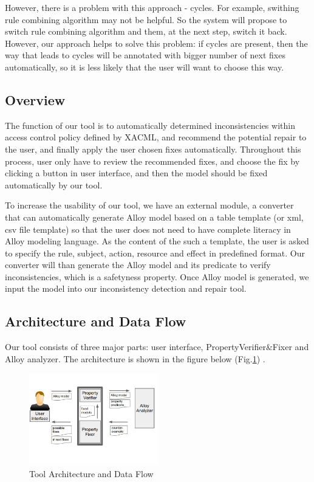 \documentclass{acm_proc_article-sp}
\begin{document}
However, there is a problem with this approach - cycles. For example, swithing rule combining algorithm may not be helpful. So the system will propose to switch rule combining algorithm and them, at the next step, switch it back. However, our approach helps to solve this problem: if cycles are present, then the way that leads to cycles will be annotated with bigger number of next fixes automatically, so it is less likely that the user will want to choose this way.

\subsection{Overview}
The function of our tool is to automatically determined inconsistencies within access control policy defined by XACML, and recommend the potential repair to the user, and finally apply the user chosen fixes automatically. Throughout this process, user only have to review the recommended fixes, and choose the fix by clicking a button in user interface, and then the model should be fixed automatically by our tool. 

To increase the usability of our tool, we have an external module, a converter that can automatically generate Alloy model based on a table template (or xml, csv file template) so that the user does not need to have complete literacy in Alloy modeling language. As the content of the such a template, the user is asked to specify the rule, subject, action, resource and effect in predefined format. Our converter will than generate the Alloy model and its predicate to verify inconsistencies, which is a safetyness property. Once Alloy model is generated, we input the model into our inconsistency detection and repair tool. 

\subsection{Architecture and Data Flow}

Our tool consists of three major parts: user interface, PropertyVerifier\&Fixer and Alloy analyzer. The architecture is shown in the figure below (Fig.\ref{fig:Architecture}) .\\

\begin{figure}[h]
\includegraphics[width=0.5\textwidth]{DataFlow.JPG}
\caption{Tool Architecture and Data Flow}    
  \label{fig:Architecture}
\end{figure}
\end{document}
